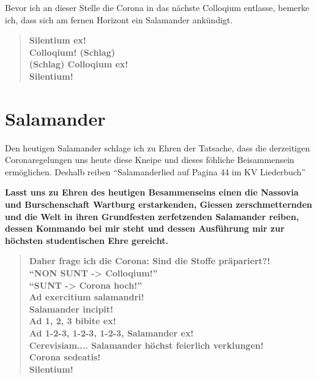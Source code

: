 Bevor ich an dieser Stelle die Corona in das nächste Colloqium
entlasse, bemerke ich, dass sich am fernen Horizont ein Salamander
ankündigt.
\begin{quote}
    \textbf{
        Silentium ex!\\
        Colloqium! (Schlag)\\
        (Schlag) Colloqium ex!\\
        Silentium!\\
    }
\end{quote}
\newpage
\section{Salamander}
Den heutigen Salamander schlage ich zu Ehren der Tatsache,
dass die derzeitigen Coronaregelungen uns heute diese Kneipe
und dieses föhliche Beisammensein ermöglichen. Deshalb reiben
\enquote{Salamanderlied auf Pagina 44 im KV Liederbuch}

\textbf{
    Lasst uns zu Ehren des heutigen Besammenseins einen die 
    Nassovia und Burschenschaft Wartburg erstarkenden, Giessen
    zerschmetternden und die Welt in ihren Grundfesten zerfetzenden
    Salamander reiben, dessen Kommando bei mir steht und dessen
    Ausführung mir zur höchsten studentischen Ehre gereicht. 
}
\begin{quote}
    \textbf{
        Daher frage ich die Corona: Sind die Stoffe präpariert?!\\
        \enquote{NON SUNT -> Colloqium!}\\
        \enquote{SUNT -> Corona hoch!}\\
        Ad exercitium salamandri!\\
        Salamander incipit!\\
        Ad 1, 2, 3 bibite ex!\\
        Ad 1-2-3, 1-2-3, 1-2-3, Salamander ex!\\
        Cerevisiam....
        Salamander höchst feierlich verklungen!\\
        Corona sedeatis!\\
        Silentium!
    }
\end{quote}